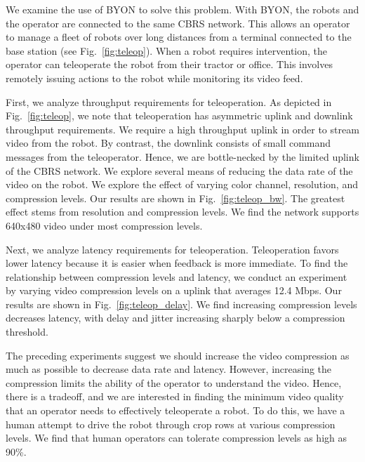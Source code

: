 We examine the use of BYON to solve this problem. With BYON, the robots and the operator are connected to the same CBRS network. This allows an operator to manage a fleet of robots over long distances from a terminal connected to the base station (see Fig.~\ref{fig:teleop}). When a robot requires intervention, the operator can teleoperate the robot from their tractor or office. This involves remotely issuing actions to the robot while monitoring its video feed.

First, we analyze throughput requirements for teleoperation. As depicted in Fig.~\ref{fig:teleop}, we note that teleoperation has asymmetric uplink and downlink throughput requirements. We require a high throughput uplink in order to stream video from the robot. By contrast, the downlink consists of small command messages from the teleoperator. Hence, we are bottle-necked by the limited uplink of the CBRS network. We explore several means of reducing the data rate of the video on the robot. We explore the effect of varying color channel, resolution, and compression levels. Our results are shown in Fig.~\ref{fig:teleop_bw}. The greatest effect stems from resolution and compression levels. We find the network supports 640x480 video under most compression levels.

 Next, we analyze latency requirements for teleoperation. Teleoperation favors lower latency because it is easier when feedback is more immediate. To find the relationship between compression levels and latency, we conduct an experiment by varying video compression levels on a uplink that averages 12.4 Mbps. Our results are shown in Fig.~\ref{fig:teleop_delay}. We find increasing compression levels decreases latency, with delay and jitter increasing sharply below a compression threshold. 

 The preceding experiments suggest we should increase the video compression as much as possible to decrease data rate and latency. However, increasing the compression limits the ability of the operator to understand the video. Hence, there is a tradeoff, and we are interested in finding the minimum video quality that an operator needs to effectively teleoperate a robot. To do this, we have a human attempt to drive the robot through crop rows at various compression levels. We find that human operators can tolerate compression levels as high as 90\%.

